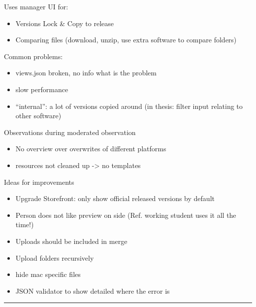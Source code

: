 Uses manager UI for:
\begin{itemize}[nosep]
  \item Versions Lock \& Copy to release
  \item Comparing files (download, unzip, use extra software to compare folders)
\end{itemize}

Common problems:
\begin{itemize}[nosep]
  \item views.json broken, no info what is the problem
  \item slow performance
  \item “internal”: a lot of versions copied around (in thesis: filter input relating to other software)
\end{itemize}

Observations during moderated observation
\begin{itemize}[nosep]
  \item No overview over overwrites of different platforms
  \item resources not cleaned up -> no templates
\end{itemize}

Ideas for improvements
\begin{itemize}[nosep]
  \item Upgrade Storefront: only show official released versions by default
  \item Person does not like preview on side (Ref. working student uses it all the time!)
  \item Uploads should be included in merge
  \item Upload folders recursively
  \item hide mac specific files
  \item JSON validator to show detailed where the error is
\end{itemize}
\bigskip
\hrule
\newpage
